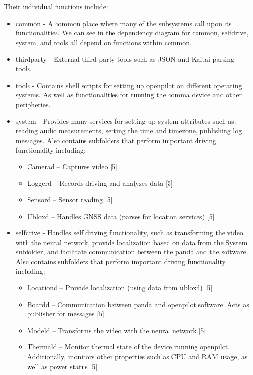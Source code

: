 \documentclass[12pt]{article}
\begin{document}
Their individual functions include:
\begin{itemize}
    \item common - A common place where many of the subsystems call upon its functionalities. We can see in the dependency diagram for common, selfdrive, system, and tools all depend on functions within common.
    \item third\textunderscore party - External third party tools such as JSON and Kaitai parsing tools.
    \item tools - Contains shell scripts for setting up openpilot on different operating systems. As well as functionalities for running the comma device and other peripheries.
    \item system - Provides many services for setting up system attributes such as: reading audio measurements, setting the time and timezone, publishing log messages. Also contains subfolders that perform important driving functionality including:
        \begin{itemize}
            \item Camerad – Captures video [5]
	    \item Loggerd – Records driving and analyzes data [5]
	    \item Sensord – Sensor reading [5]
	    \item Ubloxd – Handles GNSS data (parses for location services) [5]
        \end{itemize}
    \item selfdrive - Handles self driving functionality, such as transforming the video with the neural network, provide localization based on data from the System subfolder, and facilitate communication between the panda and the software. Also contains subfolders that perform important driving functionality including:
        \begin{itemize}
            \item Locationd – Provide localization (using data from ubloxd) [5]
	    \item Boardd – Communication between panda and openpilot                  software. Acts as publisher for messages [5]
	      \item Modeld – Transforms the video with the neural network [5]
	      \item Thermald – Monitor thermal state of the device running openpilot. Additionally, monitors other properties such as CPU and RAM usage, as well as power status [5]

        \end{itemize}
\end{itemize}
\end{document}
